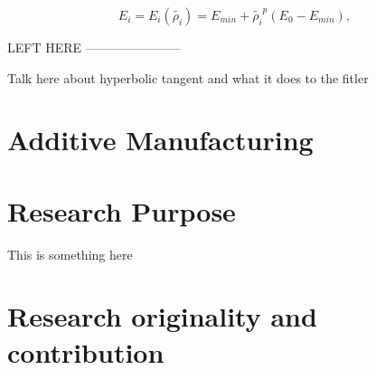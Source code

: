 \documentclass[../main.tex]{subfiles}
\begin{document}

\begin{equation}
  E_i = E_i(\tilde{\rho_i}) = E_{min} + \tilde{\rho_i}^p (E_0 - E_{min}),
  \label{eq:young_filtered}
\end{equation}




LEFT HERE -----------------------

Talk here about hyperbolic tangent and what it does to the fitler

\section{Additive Manufacturing}

\section{Research Purpose}
 
This is something here

\section{Research originality and contribution}
\end{document}
